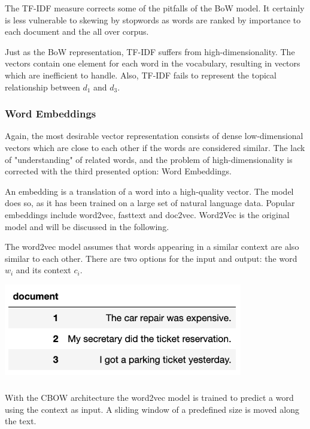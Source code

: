 		The \ac{TF-IDF} measure corrects some of the pitfalls of the \ac{BoW} model. It certainly is less vulnerable to skewing by stopwords as words are ranked by importance to each document and the all over corpus. 
		
		Just as the \ac{BoW} representation, \ac{TF-IDF} suffers from high-dimensionality. The vectors contain one element for each word in the vocabulary, resulting in vectors which are inefficient to handle.
		Also, \ac{TF-IDF} fails to represent the topical relationship between $ d_{1} $ and $ d_{3}$. 
		
		\subsubsection{Word Embeddings}
		 Again, the most desirable vector representation consists of dense low-dimensional vectors which are close to each other if the words are considered similar. The lack of "understanding" of related words, and the problem of high-dimensionality is corrected with the third presented option: Word Embeddings.
		
		An embedding is a translation of a word into a high-quality vector. The model does so, as it has been trained on a large set of natural language data. Popular embeddings include word2vec, fasttext and doc2vec. Word2Vec is the original model and will be discussed in the following. 
		
		The word2vec model assumes that words appearing in a similar context are also similar to each other. There are two options for the input and output: the word $w_i$ and its context $c_i$.
		
		\includegraphics[height=4cm]{Bilder/word2vec/documents.png}
		
		\subparagraph{} 
		With the \ac{CBOW} architecture the word2vec model is trained to predict a word using the context as input. A sliding window of a predefined size is moved along the text. 
		
